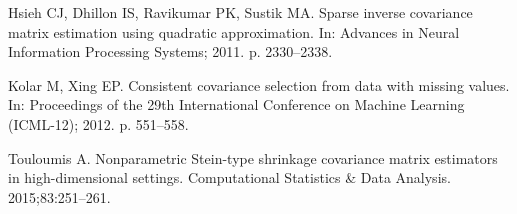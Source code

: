 \documentclass[10pt,letterpaper]{article}
\begin{document}
\begin{thebibliography}{10}
Hsieh CJ, Dhillon IS, Ravikumar PK, Sustik MA.
\newblock Sparse inverse covariance matrix estimation using quadratic
  approximation.
\newblock In: Advances in Neural Information Processing Systems; 2011. p.
  2330--2338.

Kolar M, Xing EP.
\newblock Consistent covariance selection from data with missing values.
\newblock In: Proceedings of the 29th International Conference on Machine
  Learning (ICML-12); 2012. p. 551--558.

Touloumis A.
\newblock Nonparametric Stein-type shrinkage covariance matrix estimators in
  high-dimensional settings.
\newblock Computational Statistics \& Data Analysis. 2015;83:251--261.

\end{thebibliography}
\end{document}
